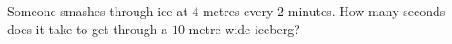 Someone smashes through ice at $4$ metres every $2$ minutes. How many seconds does it take to get through a $10$-metre-wide iceberg?
